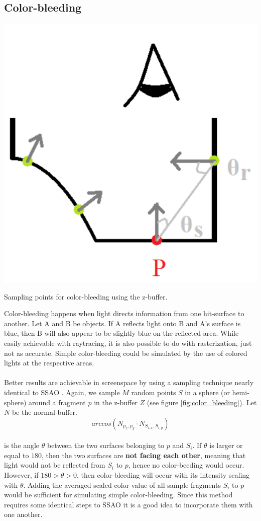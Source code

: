\documentclass{ACGSeminar}
\begin{document}
	\subsection{Color-bleeding}%
		\begin{floatingfigure}[l]{.3\textwidth}%
			\includegraphics[width=.3\textwidth]{img/color_bleeding_sampling.png}%

			\caption{Sampling points for color-bleeding using the z-buffer.}%
			\label{fig:color_bleeding}%
		\end{floatingfigure}%
		Color-bleeding happens when light directs information from one hit-surface to another. Let A and B be objects. If A reflects light onto B and A's surface is blue, then B will also appear to be slightly blue on the reflected area. While easily achievable with raytracing, it is also possible to do with rasterization, just not as accurate. Simple color-bleeding could be simulated by the use of colored lights at the respective areas. \\\\
		Better results are achievable in screenspace by using a sampling technique nearly identical to SSAO \cite{CBB}. Again, we sample $M$ random points $S$ in a sphere (or hemi-sphere) around a fragment $p$ in the z-buffer $Z$ (see figure \ref{fig:color_bleeding}). Let $N$ be the normal-buffer.
		$$ arccos(N_{p_{x}, p_{y}} \cdot N_{S_{i, x}, S_{i, y}}) $$
		\\
		is the angle $\theta$ between the two surfaces belonging to $p$ and $S_i$. If $\theta$ is larger or equal to $180$, then the two surfaces are \textbf{not facing each other}, meaning that light would not be reflected from $S_i$ to $p$, hence no color-beeding would occur. However, if $180 > \theta > 0$, then color-bleeding will occur with its intensity scaling with $\theta$. Adding the averaged scaled color value of all sample fragments $S_i$ to $p$ would be sufficient for simulating simple color-bleeding. Since this method requires some identical steps to SSAO it is a good idea to incorporate them with one another. \\\\
\end{document}
